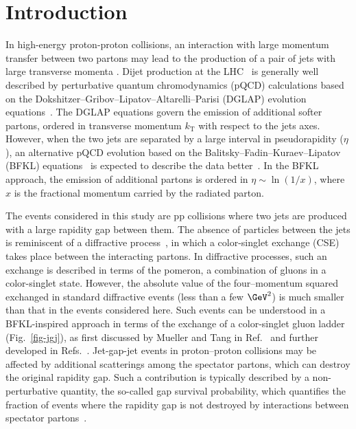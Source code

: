 \documentclass[11pt,twoside,a4paper,cmspaper,final,collab]{cms-tdr}
\begin{document}

\maketitle
\section{Introduction}

In high-energy proton-proton collisions, an interaction with large momentum transfer between two partons may lead to the production of a pair of jets with large transverse momenta \pt.
Dijet production at the LHC~\cite{Khachatryan:2011zj,Chatrchyan:2011qta,Chatrchyan:2012gwa,Chatrchyan:2012pb,Khachatryan:2016hkr,Sirunyan:2017skj,Aad:2010ad,Aad:2011jz,Aad:2011fc,Aad:2013tea,Aad:2014pua,Aad:2015xis} is generally well described by perturbative quantum chromodynamics (pQCD) calculations based on the Dokshitzer--Gribov--Lipatov--Altarelli--Parisi (DGLAP) evolution equations~\cite{dglap1,dglap2,dglap3}. The DGLAP equations govern the emission of additional softer partons, ordered in transverse momentum $k_\mathrm{T}$ with respect to the jets axes. However, when the two jets are separated by a large interval in pseudorapidity ($\eta$), an alternative pQCD evolution based on the Balitsky--Fadin--Kuraev--Lipatov (BFKL) equations~\cite{bfkl1,bfkl2,bfkl3} is expected to describe the data better~\cite{bj}. In the BFKL approach, the emission of additional partons is ordered in $\eta\sim\ln(1/x)$, where $x$ is the fractional momentum carried by the radiated parton.


The events considered in this study are pp collisions where two jets are produced with a large rapidity gap between them. The absence of particles between the jets is reminiscent of a diffractive process~\cite{diffraction}, in which a color-singlet exchange (CSE) takes place between the interacting partons. In diffractive processes, such an exchange is described in terms of the pomeron, a combination of gluons in a color-singlet state. However, the absolute value of the four--momentum squared exchanged in standard diffractive events (less than a few $\GeV^2$) is much smaller than that in the events considered here. Such events can be understood in a BFKL-inspired approach in terms of the exchange of a color-singlet gluon ladder (Fig.~\ref{fig-jgj}), as first discussed by Mueller and Tang in Ref.~\cite{mt} and further developed in Refs.~\cite{csp,cspLHC,kmr}. Jet-gap-jet events in proton--proton collisions may be affected by additional scatterings among the spectator partons, which can destroy the original rapidity gap. Such a contribution is typically described by a non-perturbative quantity, the so-called gap survival probability, which quantifies the fraction of events where the rapidity gap is not destroyed by interactions between spectator partons~\cite{bj}.
\end{document}
